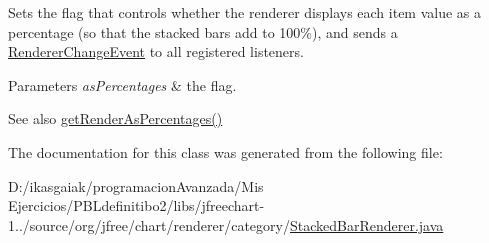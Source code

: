 Sets the flag that controls whether the renderer displays each item value as a percentage (so that the stacked bars add to 100\%), and sends a \mbox{\hyperlink{}{Renderer\+Change\+Event}} to all registered listeners.


\begin{DoxyParams}{Parameters}
{\em as\+Percentages} & the flag.\\
\hline
\end{DoxyParams}
\begin{DoxySeeAlso}{See also}
\mbox{\hyperlink{classorg_1_1jfree_1_1chart_1_1renderer_1_1category_1_1_stacked_bar_renderer_aa0f15aa6eb267d252b8895e826da57a2}{get\+Render\+As\+Percentages()}} 
\end{DoxySeeAlso}


The documentation for this class was generated from the following file\+:\begin{DoxyCompactItemize}
\item 
D\+:/ikasgaiak/programacion\+Avanzada/\+Mis Ejercicios/\+P\+B\+Ldefinitibo2/libs/jfreechart-\/1../source/org/jfree/chart/renderer/category/\mbox{\hyperlink{_stacked_bar_renderer_8java}{Stacked\+Bar\+Renderer.\+java}}\end{DoxyCompactItemize}
